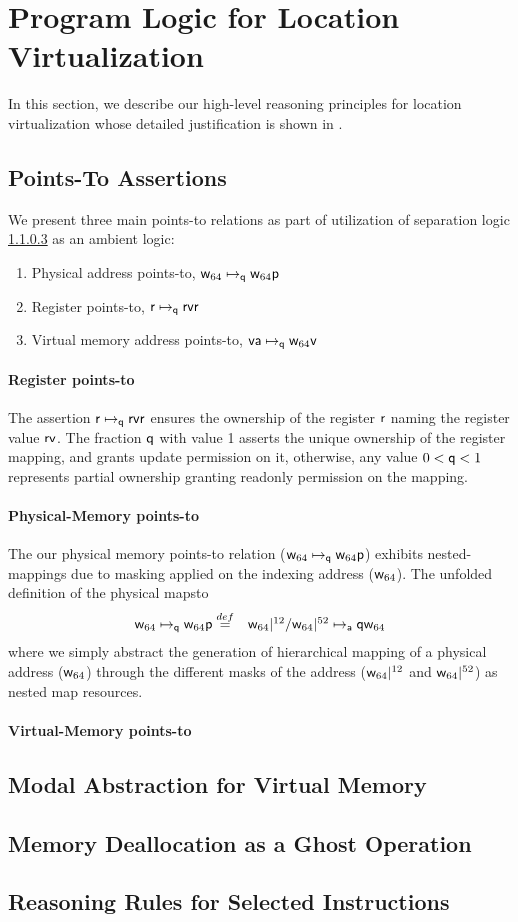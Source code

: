 \section{Program Logic for Location Virtualization}
\label{sec:logic}
In this section, we describe our high-level reasoning principles for location virtualization whose detailed justification is shown in . 
\subsection{Points-To Assertions}
\label{sec:pointsto}

We present three main points-to relations as part of utilization of separation logic \ref{} as an ambient logic:
\begin{enumerate}
\item Physical address points-to, $\mathsf{w}_{64}\mapsto_{\mathsf{q}}{\mathsf{w}_{64}}\mathsf{p}$
\item Register points-to, $\mathsf{r}\mapsto_{\mathsf{q}}{\mathsf{rv}}\mathsf{r}$
\item Virtual memory address points-to, $\mathsf{va}\mapsto_{\mathsf{q}}{\mathsf{w}_{64}}\mathsf{v}$
\end{enumerate}
\paragraph{Register points-to} The assertion $\mathsf{r}\mapsto_{\mathsf{q}}{\mathsf{rv}}\mathsf{r}$ ensures the ownership of the register $\mathsf{r}$ naming the register value $\mathsf{rv}$. The fraction $\mathsf{q}$ with value 1 asserts the unique ownership of the register mapping, and grants update permission on it, otherwise, any value $0 < \mathsf{q} <1$ represents partial ownership granting readonly permission on the mapping.
\paragraph{Physical-Memory points-to} The our physical memory points-to relation ($\mathsf{w}_{64}\mapsto_{\mathsf{q}}{\mathsf{w}_{64}}\mathsf{p}$) exhibits nested-mappings due to masking applied on the indexing address ($\mathsf{w}_{64}$). The unfolded definition of the physical mapsto 
\[
\begin{array}{cl}
\mathsf{w}_{64}\mapsto_{\mathsf{q}}{\mathsf{w}_{64}}\mathsf{p} \stackrel{def}{=} & \mathsf{w}_{64}|^{12} / \mathsf{w}_{64}|^{52} \mapsto_{\mathsf{a}}{\mathsf{q}}\mathsf{w}_{64}
\end{array}
\]
where we simply abstract the generation of hierarchical mapping of a physical address ($\mathsf{w}_{64}$) through the different masks of the address ($\mathsf{w}_{64}|^{12}$ and $\mathsf{w}_{64}|^{52}$) as nested map resources.
\paragraph{Virtual-Memory points-to}
\subsection{Modal Abstraction for Virtual Memory}
\label{sec:credits}


\subsection{Memory Deallocation as a Ghost Operation}
\label{sec:free}

\subsection{Reasoning Rules for Selected Instructions}
\label{sec:reasoning}



